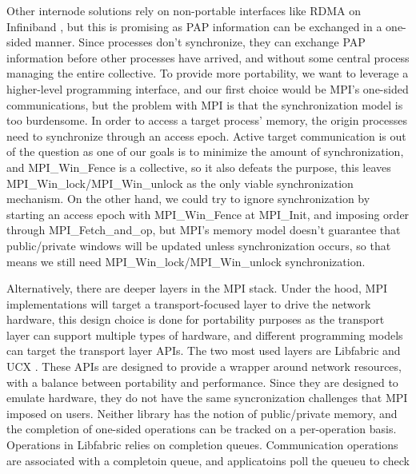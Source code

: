 Other internode solutions rely on non-portable interfaces like RDMA on Infiniband \cite{Qian2009ProcArrivalSHMA2AIB}, but this is promising as PAP information can be exchanged in a one-sided manner.
Since processes don't synchronize, they can exchange PAP information before other processes have arrived, and without some central process managing the entire collective. 
To provide more portability, we want to leverage a higher-level programming interface, and our first choice would be MPI's one-sided communications, but the problem with MPI is that the synchronization model is too burdensome. 
In order to access a target process' memory, the origin processes need to synchronize through an access epoch. 
Active target communication is out of the question as one of our goals is to minimize the amount of synchronization, and MPI\_Win\_Fence is a collective, so it also defeats the purpose, this leaves  MPI\_Win\_lock/MPI\_Win\_unlock as the only viable synchronization mechanism.
On the other hand, we could try to ignore synchronization by starting an access epoch with MPI\_Win\_Fence at MPI\_Init, and imposing order through MPI\_Fetch\_and\_op, but MPI's memory model doesn't guarantee that public/private windows will be updated unless synchronization occurs, so that means we still need MPI\_Win\_lock/MPI\_Win\_unlock synchronization.

Alternatively, there are deeper layers in the MPI stack. 
Under the hood, MPI implementations will target a transport-focused layer to drive the network hardware, this design choice is done for portability purposes as the transport layer can support multiple types of hardware, and different programming models can target the transport layer APIs.
The two most used layers are Libfabric and UCX \cite{libfabric, shamis2015ucx}.
These APIs are designed to provide a wrapper around network resources, with a balance between portability and performance.
Since they are designed to emulate hardware, they do not have the same syncronization challenges that MPI imposed on users.  
Neither library has the notion of public/private memory, and the completion of one-sided operations can be tracked on a per-operation basis. 
Operations in Libfabric relies on completion queues.
Communication operations are associated with a completoin queue, and applicatoins poll the queueu to check 

